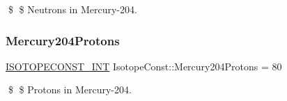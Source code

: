 \$ \$ Neutrons in Mercury-\/204. \mbox{\label{group___isotope_const-_mercury-_hg204_ga8f2e87f9b21193d877ad13abc948b1d9}} 
\subsubsection{\texorpdfstring{Mercury204\+Protons}{Mercury204Protons}}
{\footnotesize\ttfamily \mbox{\hyperlink{group___isotope_const-_macros_ga5f18360b3e99483a35c32d789e62621c}{I\+S\+O\+T\+O\+P\+E\+C\+O\+N\+S\+T\+\_\+\+I\+NT}} Isotope\+Const\+::\+Mercury204\+Protons = 80}

\$ \$ Protons in Mercury-\/204. 
